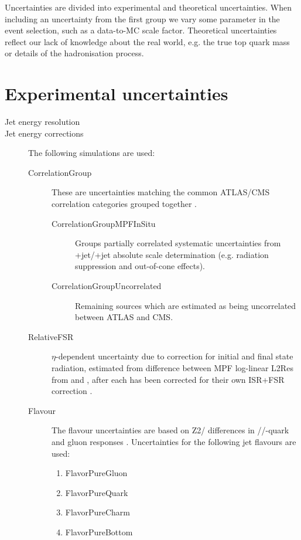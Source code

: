 Uncertainties are divided into experimental and theoretical uncertainties. When including an uncertainty from the first group we vary some parameter in the event selection, such as a data-to-MC scale factor. Theoretical uncertainties reflect our lack of knowledge about the real world, e.g. the true top quark mass or details of the hadronisation process.

\section{Experimental uncertainties}
\begin{description}
\item[Jet energy resolution] 

\item[Jet energy corrections] The following simulations are used:
\begin{description}
        \item[CorrelationGroup]  These are uncertainties matching the common ATLAS/CMS correlation categories grouped together \cite{twiki:JESUS}. 
        \begin{description}                     
              \item[CorrelationGroupMPFInSitu] Groups partially correlated systematic uncertainties from \cPZ+jet/\cPgg+jet absolute scale determination (e.g. radiation suppression and out-of-cone effects).
              \item[CorrelationGroupUncorrelated] Remaining sources which are estimated as being uncorrelated between ATLAS and CMS.
        \end{description}
        \item[RelativeFSR] $\eta$-dependent uncertainty due to correction for initial and final state radiation, estimated from difference between MPF log-linear L2Res from  and \HERWIGpp, after each has been corrected for their own ISR+FSR correction \cite{Khachatryan:2016kdb}.
        \item[Flavour]  The flavour uncertainties are based on  Z2/ differences in \cPqu\cPqd\cPqs/\cPqc/\cPqb-quark and gluon responses \cite{Khachatryan:2016kdb}. Uncertainties for the following jet flavours are used:
        \begin{enumerate}
                \item FlavorPureGluon
                \item FlavorPureQuark
                \item FlavorPureCharm
                \item FlavorPureBottom
        \end{enumerate}
\end{description}


\end{description}
